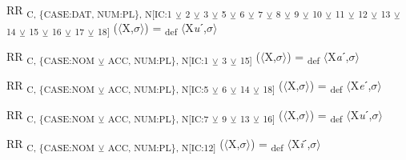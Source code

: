 {\begin{exe}
 RR \textsubscript{C, \{CASE:DAT, NUM:PL\}, N[IC:1} \textsubscript{${\veebar}$}\textsubscript{ 2} \textsubscript{${\veebar}$}\textsubscript{ 3} \textsubscript{${\veebar}$}\textsubscript{ 5} \textsubscript{${\veebar}$}\textsubscript{ 6} \textsubscript{${\veebar}$}\textsubscript{ 7} \textsubscript{${\veebar}$}\textsubscript{ 8} \textsubscript{${\veebar}$}\textsubscript{ 9} \textsubscript{${\veebar}$}\textsubscript{ 10} \textsubscript{${\veebar}$}\textsubscript{ 11} \textsubscript{${\veebar}$}\textsubscript{ 12} \textsubscript{${\veebar}$}\textsubscript{ 13} \textsubscript{${\veebar}$}\textsubscript{ 14} \textsubscript{${\veebar}$}\textsubscript{ 15} \textsubscript{${\veebar}$}\textsubscript{ 16} \textsubscript{${\veebar}$}\textsubscript{ 17} \textsubscript{${\veebar}$}\textsubscript{ 18]} ($\langle$X,$\sigma $$\rangle$) = \textsubscript{def} $\langle$X\textit{u}ˊ,$\sigma $$\rangle$
\end{exe}

\begin{exe}
 RR \textsubscript{C, \{CASE:NOM} \textsubscript{${\veebar}$}\textsubscript{ ACC, NUM:PL\}, N[IC:1} \textsubscript{${\veebar}$}\textsubscript{ 3} \textsubscript{${\veebar}$}\textsubscript{ 15]} ($\langle$X,$\sigma $$\rangle$) = \textsubscript{def} $\langle$X\textit{a}ˊ,$\sigma $$\rangle$
\end{exe}

\begin{exe}
 RR \textsubscript{C, \{CASE:NOM} \textsubscript{${\veebar}$}\textsubscript{ ACC, NUM:PL\}, N[IC:5} \textsubscript{${\veebar}$}\textsubscript{ 6} \textsubscript{${\veebar}$}\textsubscript{ 14} \textsubscript{${\veebar}$}\textsubscript{ 18]} ($\langle$X,$\sigma $$\rangle$) = \textsubscript{def} $\langle$X\textit{e}ˊ,$\sigma $$\rangle$
\end{exe}

\begin{exe}
 RR \textsubscript{C, \{CASE:NOM} \textsubscript{${\veebar}$}\textsubscript{ ACC, NUM:PL\}, N[IC:7} \textsubscript{${\veebar}$}\textsubscript{ 9} \textsubscript{${\veebar}$}\textsubscript{ 13} \textsubscript{${\veebar}$}\textsubscript{ 16]} ($\langle$X,$\sigma $$\rangle$) = \textsubscript{def} $\langle$X\textit{u}ˊ,$\sigma $$\rangle$
\end{exe}

\begin{exe}
 RR \textsubscript{C, \{CASE:NOM} \textsubscript{${\veebar}$}\textsubscript{ ACC, NUM:PL\}, N[IC:12]} ($\langle$X,$\sigma $$\rangle$) = \textsubscript{def} $\langle$X\textit{i}ˊ,$\sigma $$\rangle$
\end{exe}

}
